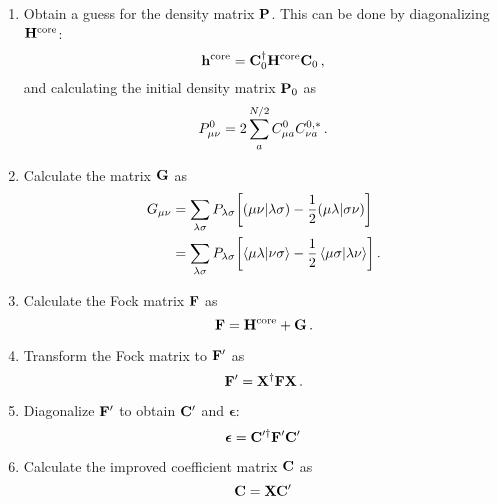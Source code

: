 \documentclass[12pt]{article}
\begin{document}
\begin{enumerate}
        \item Obtain a guess for the density matrix $\vb{P}$. This can be done by diagonalizing $\vb{H}^\text{core}$:
        \begin{equation}
            \vb{h}^\text{core} = \vb{C}^\dagger_0 \vb{H}^\text{core} \vb{C}_0 \thinspace ,
        \end{equation}
        and calculating the initial density matrix $\vb{P}_0$ as
        \begin{equation}
            P_{\mu \nu}^0 = 2 \sum_a^{N/2} C_{\mu a}^0 C_{\nu a}^{0, *} \thinspace .
        \end{equation}

        \item \label{item:scf:g_matrix}  Calculate the matrix $\vb{G}$ as
        \begin{align}
            G_{\mu \nu} &= \sum_{\lambda \sigma} P_{\lambda \sigma} \qty[ (\mu \nu|\lambda \sigma) - \frac{1}{2} (\mu \lambda|\sigma \nu)] \\
            &= \sum_{\lambda \sigma} P_{\lambda \sigma} \qty[ \braket{\mu \lambda}{\nu \sigma} - \frac{1}{2} \braket{\mu \sigma}{\lambda \nu}] \thinspace .
        \end{align}

        \item Calculate the Fock matrix $\vb{F}$ as
        \begin{equation}
            \vb{F} = \vb{H}^\text{core} + \vb{G} \thinspace .
        \end{equation}

        \item Transform the Fock matrix to $\vb{F}'$ as
        \begin{equation}
            \vb{F}' = \vb{X}^\dagger \vb{F} \vb{X} \thinspace .
        \end{equation}

        \item Diagonalize $\vb{F}'$ to obtain $\vb{C}'$ and $\boldsymbol{\epsilon}$:
        \begin{equation}
            \boldsymbol{\epsilon} = \vb{C}'^\dagger \vb{F}' \vb{C}'
        \end{equation}

        \item Calculate the improved coefficient matrix $\vb{C}$ as
        \begin{equation}
            \vb{C} = \vb{X} \vb{C}'
        \end{equation}


\end{enumerate}
\end{document}
